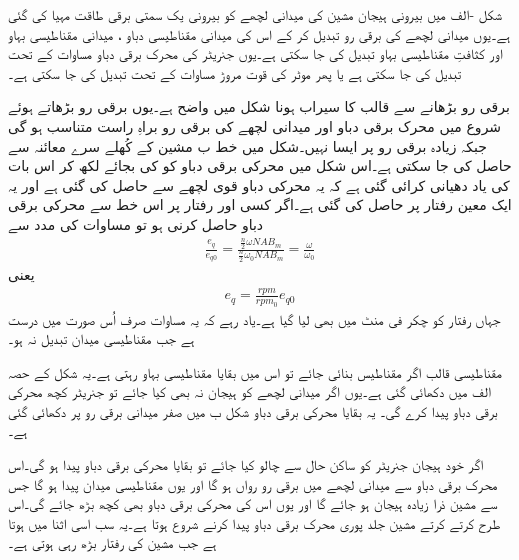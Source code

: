 شکل -الف میں بیرونی ہیجان مشین کی میدانی لچھے کو بیرونی یک سمتی برقی طاقت مہیا کی گئی ہے۔یوں میدانی لچھے کی برقی رو تبدیل کر کے اس کی میدانی مقناطیسی دباو  ، میدانی مقناطیسی بہاو   اور کثافتِ مقناطیسی بہاو   تبدیل کی جا سکتی ہے۔یوں جنریٹر کی محرک برقی دباو مساوات   کے تحت تبدیل کی جا سکتی ہے یا پھر موٹر کی قوت مروڑ مساوات   کے تحت تبدیل کی جا سکتی ہے۔

برقی رو بڑھانے سے قالب کا سیراب ہونا شکل   میں واضح ہے۔یوں برقی رو بڑھاتے ہوئے شروع میں محرک برقی دباو اور میدانی لچھے کی برقی رو براہِ راست متناسب ہو گی جبکہ زیادہ برقی رو پر ایسا نہیں۔شکل میں خط ب مشین کے کُھلے سرے معائنہ سے حاصل کی جا سکتی ہے۔اس شکل میں محرکی برقی دباو کو  کی بجائے   لکھ کر اس بات کی یاد دھیانی کرائی گئی ہے کہ یہ محرکی دباو  قوی لچھے سے حاصل کی گئی ہے اور یہ ایک معین رفتار  پر حاصل کی گئی ہے۔اگر کسی اور رفتار  پر اس خط سے محرکی برقی دباو  حاصل کرنی ہو تو مساوات   کی مدد سے
\begin{align}
\frac{e_q}{e_{q0}}=\frac{\frac{n}{2} \omega N A B_m}{\frac{n}{2} \omega_0 N A B_m}=\frac{\omega}{\omega_0}
\end{align}
یعنی
\begin{align}\label{مساوات_یکسمتی_چکر_بالمقابل_رفتار}
e_q=\frac{rpm}{rpm_0} e_{q0}
\end{align}
جہاں رفتار کو چکر فی منٹ میں بھی لیا گیا ہے۔یاد رہے کہ یہ مساوات صرف اُس صورت میں درست ہے جب مقناطیسی میدان تبدیل نہ ہو۔

مقناطیسی قالب اگر مقناطیس بنائی جائے تو اس میں بقایا مقناطیسی بہاو رہتی ہے۔یہ شکل کے حصہ الف میں دکھائی گئی ہے۔یوں اگر میدانی لچھے کو ہیجان نہ بھی کیا جائے تو جنریٹر کچھ محرکی برقی دباو پیدا کرے گی۔ یہ بقایا  محرکی برقی دباو شکل ب میں صفر میدانی برقی رو پر دکھائی گئی ہے۔

 اگر خود ہیجان جنریٹر کو ساکن حال سے چالو کیا جائے تو بقایا محرکی برقی دباو پیدا ہو گی۔اس محرک برقی دباو سے میدانی لچھے میں برقی رو رواں ہو گا اور یوں مقناطیسی میدان پیدا ہو گا جس سے مشین ذرا زیادہ ہیجان ہو جائے گا اور یوں اس کی محرکی برقی دباو بھی کچھ بڑھ جائے گی۔اس طرح کرتے کرتے مشین جلد پوری محرک برقی دباو پیدا کرنے شروع ہوتا ہے۔یہ سب اسی اثنا میں ہوتا ہے جب مشین کی رفتار بڑھ رہی ہوتی ہے۔

